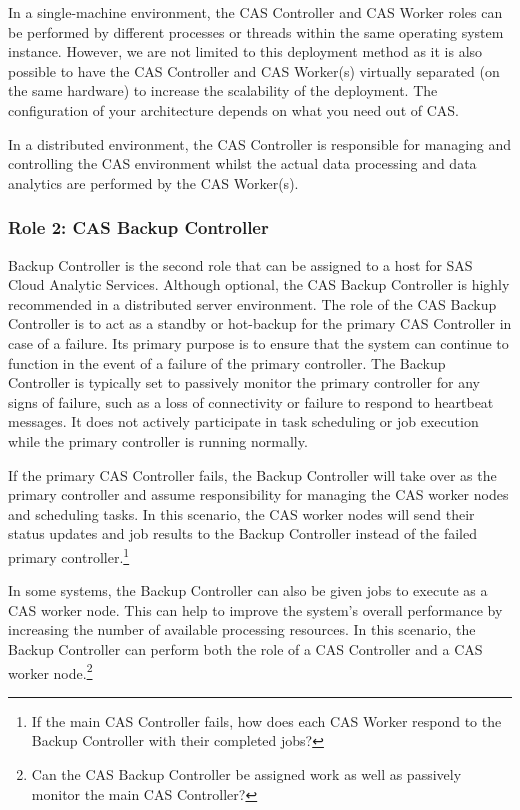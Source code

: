 In a single-machine environment, the CAS Controller and CAS Worker roles can be performed by different processes or threads within the same operating system instance. However, we are not limited to this deployment method as it is also possible to have the CAS Controller and CAS Worker(s) virtually separated (on the same hardware) to increase the scalability of the deployment. The configuration of your architecture depends on what you need out of CAS.  

In a distributed environment, the CAS Controller is responsible for managing and controlling the CAS environment whilst the actual data processing and data analytics are performed by the CAS Worker(s).

\subsubsection{Role 2: CAS Backup Controller}
Backup Controller is the second role that can be assigned to a host for SAS Cloud Analytic Services. Although optional, the CAS Backup Controller is highly recommended in a distributed server environment. The role of the CAS Backup Controller is to act as a standby or hot-backup for the primary CAS Controller in case of a failure. Its primary purpose is to ensure that the system can continue to function in the event of a failure of the primary controller. The Backup Controller is typically set to passively monitor the primary controller for any signs of failure, such as a loss of connectivity or failure to respond to heartbeat messages. It does not actively participate in task scheduling or job execution while the primary controller is running normally. 

If the primary CAS Controller fails, the Backup Controller will take over as the primary controller and assume responsibility for managing the CAS worker nodes and scheduling tasks. In this scenario, the CAS worker nodes will send their status updates and job results to the Backup Controller instead of the failed primary controller.\footnote{If the main CAS Controller fails, how does each CAS Worker respond to the Backup Controller with their completed jobs?}

In some systems, the Backup Controller can also be given jobs to execute as a CAS worker node. This can help to improve the system's overall performance by increasing the number of available processing resources. In this scenario, the Backup Controller can perform both the role of a CAS Controller and a CAS worker node.\footnote{Can the CAS Backup Controller be assigned work as well as passively monitor the main CAS Controller?}

